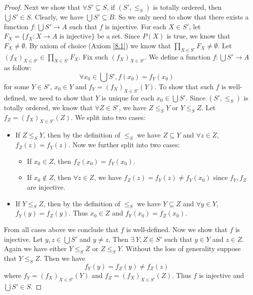 \begin{proof}
    Next we show that \(\forall S' \subseteq S\), if \((S', \leq_S)\) is totally ordered, then \(\bigcup S' \in S\).
    Clearly, we have \(\bigcup S' \subseteq B\).
    So we only need to show that there exists a function \(f : \bigcup S' \to A\) such that \(f\) is injective.
    For each \(X \in S'\), let \(F_X = \{f_X : X \to A \text{ is injective}\}\) be a set.
    Since \(P(X)\) is true, we know that \(F_X \neq \emptyset\).
    By axiom of choice (Axiom \ref{8.1}) we know that \(\prod_{X \in S'} F_X \neq \emptyset\).
    Let \((f_X)_{X \in S'} \in \prod_{X \in S'} F_X\).
    Fix such \((f_X)_{X \in S'}\).
    We define a function \(f : \bigcup S' \to A\) as follow:
    \[
        \forall x_0 \in \bigcup S', f(x_0) = f_Y(x_0)
    \]
    for some \(Y \in S'\), \(x_0 \in Y\) and \(f_Y = (f_X)_{X \in S'}(Y)\).
    To show that such \(f\) is well-defined, we need to show that \(Y\) is unique for each \(x_0 \in \bigcup S'\).
    Since \((S', \leq_S)\) is totally ordered, we know that \(\forall Z \in S'\), we have \(Z \leq_S Y\) or \(Y \leq_S Z\).
    Let \(f_Z = (f_X)_{X \in S'}(Z)\).
    We split into two cases:
    \begin{itemize}
        \item If \(Z \leq_S Y\), then by the definition of \(\leq_S\) we have \(Z \subseteq Y\) and \(\forall z \in Z\), \(f_Z(z) = f_Y(z)\).
              Now we further split into two cases:
              \begin{itemize}
                  \item If \(x_0 \in Z\), then \(f_Z(x_0) = f_Y(x_0)\).
                  \item If \(x_0 \notin Z\), then \(\forall z \in Z\), we have \(f_Z(z) = f_Y(z) \neq f_Y(x_0)\) since \(f_Y, f_Z\) are injective.
              \end{itemize}
        \item If \(Y \leq_S Z\), then by the definition of \(\leq_S\) we have \(Y \subseteq Z\) and \(\forall y \in Y\), \(f_Y(y) = f_Z(y)\).
              Thus \(x_0 \in Z\) and \(f_Y(x_0) = f_Z(x_0)\).
    \end{itemize}
    From all cases above we conclude that \(f\) is well-defined.
    Now we show that \(f\) is injective.
    Let \(y, z \in \bigcup S'\) and \(y \neq z\).
    Then \(\exists\ Y, Z \in S'\) such that \(y \in Y\) and \(z \in Z\).
    Again we have either \(Y \leq_S Z\) or \(Z \leq_S Y\).
    Without the loss of generality suppose that \(Y \leq_S Z\).
    Then we have
    \[
        f_Y(y) = f_Z(y) \neq f_Z(z)
    \]
    where \(f_Y = (f_X)_{X \in S'}(Y)\) and \(f_Z = (f_X)_{X \in S'}(Z)\).
    Thus \(f\) is injective and \(\bigcup S' \in S\).


\end{proof}
